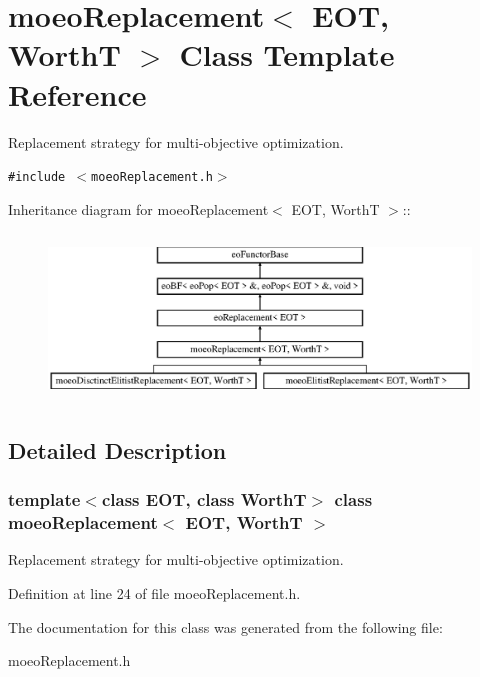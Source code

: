 \section{moeo\-Replacement$<$ EOT, Worth\-T $>$ Class Template Reference}
\label{classmoeoReplacement}
Replacement strategy for multi-objective optimization.  


{\tt \#include $<$moeo\-Replacement.h$>$}

Inheritance diagram for moeo\-Replacement$<$ EOT, Worth\-T $>$::\begin{figure}[H]
\begin{center}
\leavevmode
\includegraphics[height=4.4586cm]{classmoeoReplacement}
\end{center}
\end{figure}


\subsection{Detailed Description}
\subsubsection*{template$<$class EOT, class Worth\-T$>$ class moeo\-Replacement$<$ EOT, Worth\-T $>$}

Replacement strategy for multi-objective optimization. 



Definition at line 24 of file moeo\-Replacement.h.

The documentation for this class was generated from the following file:\begin{CompactItemize}
\item 
moeo\-Replacement.h\end{CompactItemize}
